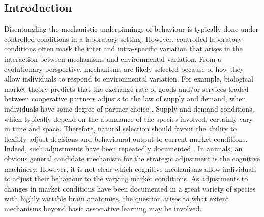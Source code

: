 \documentclass[]{rsos}%
\begin{document}
\providecommand{\EndFirstPage}{%
}

\maketitle

\hypertarget{introduction}{%
\subsection{Introduction}\label{introduction}}

Disentangling the mechanistic underpinnings of behaviour
is typically done under controlled conditions in a laboratory setting. However,
controlled laboratory conditions often mask the inter and intra-specific
variation that arises in the interaction between mechanisms and
environmental variation. From a evolutionary perspective, mechanisms
are likely selected because of how they allow individuals to respond to
environmental variation. For example, biological market theory predicts that
the exchange rate of goods and/or services traded between cooperative
partners adjusts to the law of supply and demand, when individuals have
some degree of partner choice \citep{noe_Biological_1995a}.
Supply and demand conditions, which typically
depend on the abundance of the species involved, certainly vary in time
and space. Therefore, natural selection should
favour the ability to flexibly adjust decisions and behavioural output to
current market conditions. Indeed, such adjustments have been repeatedly
documented \citep{axen_Signalling_1996}. In animals, an obvious general candidate
mechanism for the strategic adjustment is the cognitive machinery. However,
it is not clear which cognitive mechanisms allow individuals to adjust their
behaviour to the varying market conditions. As adjustments to changes in
market conditions have been documented in a great variety of species with
highly variable brain anatomies, the question arises to what extent mechanisms
beyond basic associative learning may be involved.
\end{document}
